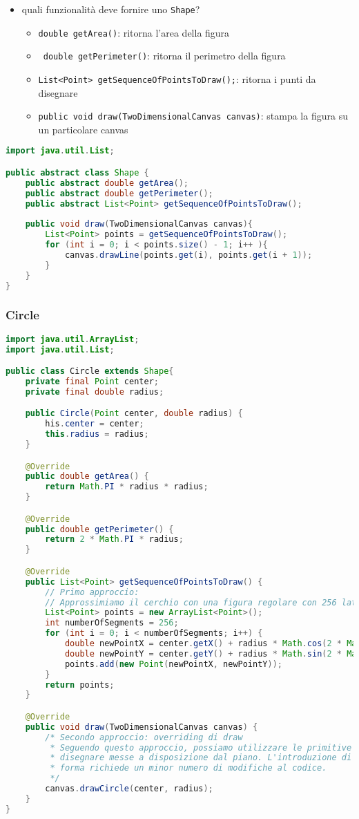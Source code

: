 \documentclass{article}
\begin{document}
\begin{itemize}
\item quali funzionalit\`a deve fornire uno \texttt{Shape}?
\begin{itemize}
\item \texttt{double getArea()}: ritorna l'area della figura
\item \texttt{ double getPerimeter()}: ritorna il perimetro della figura
\item \texttt{List<Point> getSequenceOfPointsToDraw();}: ritorna i punti da disegnare
\item \texttt{public void draw(TwoDimensionalCanvas canvas)}: stampa la figura su un particolare canvas
\end{itemize}
\end{itemize}
\begin{lstlisting}[language=Java,escapechar=|]
import java.util.List;

public abstract class Shape {
	public abstract double getArea();
	public abstract double getPerimeter();
	public abstract List<Point> getSequenceOfPointsToDraw();
	
	public void draw(TwoDimensionalCanvas canvas){
		List<Point> points = getSequenceOfPointsToDraw();
		for (int i = 0; i < points.size() - 1; i++ ){
			canvas.drawLine(points.get(i), points.get(i + 1));
		}
	}
}
\end{lstlisting}

\subsubsection{Circle}
\begin{lstlisting}[language=Java,escapechar=|]
import java.util.ArrayList;
import java.util.List;

public class Circle extends Shape{
	private final Point center;
	private final double radius;

	public Circle(Point center, double radius) {
		his.center = center;
		this.radius = radius;
	}

	@Override
	public double getArea() {
		return Math.PI * radius * radius;
	}

	@Override
	public double getPerimeter() {
		return 2 * Math.PI * radius;
	}

	@Override
	public List<Point> getSequenceOfPointsToDraw() {
		// Primo approccio: 
		// Approssimiamo il cerchio con una figura regolare con 256 lati
		List<Point> points = new ArrayList<Point>();
		int numberOfSegments = 256;
		for (int i = 0; i < numberOfSegments; i++) {
			double newPointX = center.getX() + radius * Math.cos(2 * Math.PI * i / numberOfSegments);
			double newPointY = center.getY() + radius * Math.sin(2 * Math.PI * i / numberOfSegments);
			points.add(new Point(newPointX, newPointY));
		}
		return points;
	}

	@Override
	public void draw(TwoDimensionalCanvas canvas) {
		/* Secondo approccio: overriding di draw
		 * Seguendo questo approccio, possiamo utilizzare le primitive per
		 * disegnare messe a disposizione dal piano. L'introduzione di una nuova
		 * forma richiede un minor numero di modifiche al codice.
		 */
		canvas.drawCircle(center, radius);
	}
}
\end{lstlisting}
\end{document}
